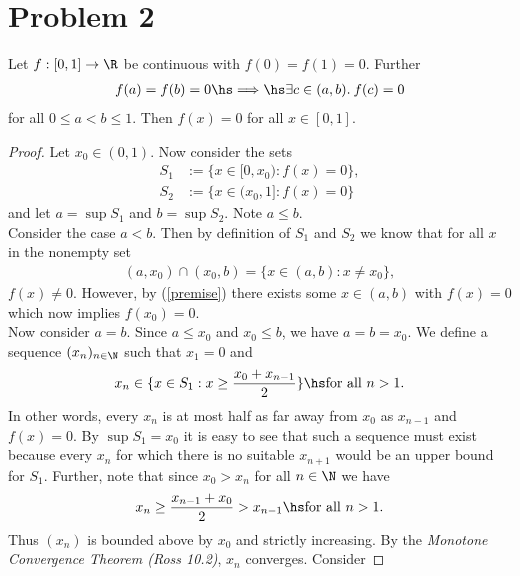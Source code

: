\documentclass{article}
\begin{document}
\section*{Problem 2}

\begin{claim*}
    Let $f:[0,1]\to\R$ be continuous with $f(0)=f(1)=0$. Further
    \begin{align}
        \label{premise}
        f(a)=f(b)=0 \hs\Longrightarrow\hs \exists c\in(a,b).\: f(c)=0
    \end{align}
    for all $0\leq a<b\leq 1$. Then $f(x)=0$ for all $x\in[0,1]$.
\end{claim*}

\begin{proof}
    Let $x_0\in(0,1)$. Now consider the sets
    \begin{align*}
        S_1 &:= \{x\in[0,x_0) : f(x) = 0\},\\
        S_2 &:= \{x\in(x_0,1] : f(x) = 0\}
    \end{align*}
    and let $a=\sup S_1$ and $b=\sup S_2$. Note $a\leq b$.\\
    \indent Consider the case $a<b$. Then by definition of $S_1$ and $S_2$
    we know that for all $x$ in the nonempty set
    \begin{align*}
        (a,x_0)\cap(x_0,b)=\{x\in(a,b):x\not=x_0\},
    \end{align*}
    $f(x)\not=0$.
    However, by (\ref{premise}) there exists some $x\in(a,b)$ with $f(x)=0$
    which now implies $f(x_0)=0$.\\
    \indent Now consider $a=b$. Since $a\leq x_0$ and $x_0\leq b$, we have 
    $a=b=x_0$. We define a sequence $(x_n)_{n\in\N}$ such that $x_1=0$ and
    \begin{align*}
        x_n \in\{x\in S_1 : x\geq \frac{x_0+x_{n-1}}{2}\} \hs\text{for all }n>1.
    \end{align*}
    In other words, every $x_n$ is at most half as far away from $x_0$ 
    as $x_{n-1}$ and $f(x)=0$. By $\sup S_1 = x_0$ it is easy to see that such
    a sequence must exist because every $x_n$ for which there is no suitable
    $x_{n+1}$ would be an upper bound for $S_1$. Further, note that since $x_0>x_n$
    for all $n\in\N$ we have
    \begin{align*}
        x_n \geq \frac{x_{n-1}+x_0}{2} > x_{n-1} \hs\text{for all }n>1.
    \end{align*}
    Thus $(x_n)$ is bounded above by $x_0$ and strictly increasing. By the
    \emph{Monotone Convergence Theorem (Ross 10.2)}, $x_n$ converges. Consider

\end{proof}
\end{document}
